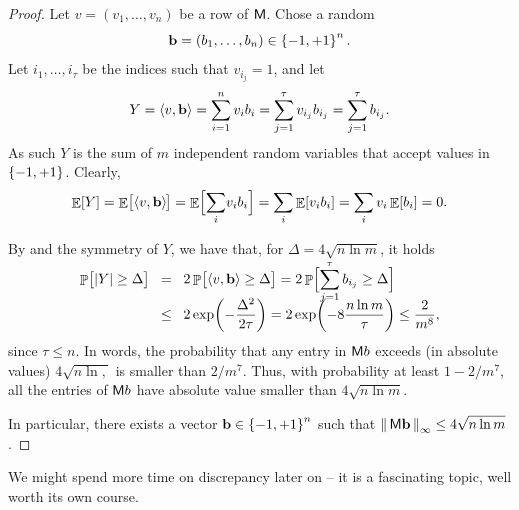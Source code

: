 \begin{proof}
    Let $v = (v_1, \ldots, v_n)$ be a row of $\mathsf{M}$. Chose a random
    \begin{equation*}
        \mathbf{b} = (b_1, \ldots, b_n) \in \left\{ {-1,+1} \right\}^n.
    \end{equation*}
    Let
    $i_1,\ldots, i_\tau$ be the indices such that $v_{i_j} =1$, and
    let
    \begin{equation*}
        Y%
        =%
        \DotProd{v}{\vecb} = \sum_{i=1}^n v_i b_i = \sum_{j=1}^\tau v_{i_j}
        b_{i_j}%
        =%
        \sum_{j=1}^\tau b_{i_j}.
    \end{equation*}
    As such $Y$ is the sum of $m$ independent random variables that
    accept values in $\left\{ {-1,+1} \right\}$.  Clearly,
    \begin{equation*}
        \Ex{Y}%
        =%
        \Ex{\bigl. \DotProd{v}{\vecb}\!\ts  }%
        =%
        \Ex{\Bigl.\smash{\sum_{i}} v_i b_i} =%
        \sum_{i} \Ex{v_i b_i} = \sum_{i} v_i \Ex{b_{i}} = 0.
    \end{equation*}

    By  and the
    symmetry of $Y$, we have that, for $\Delta = 4 \sqrt{n \ln{m}}$,
    it holds
    \begin{align*}
        \Prob{\bigl.\cardin{Y}\MakeSBig \geq \Delta} 
        &\EQ %
        2 \Prob{\bigl. \DotProd{v}{\vecb}  \geq \Delta }
        =%
        2 \Prob{\Bigl. \smash{\sum_{j=1}^\tau b_{i_j}} \geq \Delta}%
        \\
        &\LEQ%
        2 \exp \pth{ - \frac{\Delta^2}{2\tau}}
        =%
        2 \exp \pth{-8 {\frac{n\ln m}{\tau}}}%
        \leq%
        \frac{2}{m^{8}},
    \end{align*}
    since $\tau \leq n$.  In words, the probability that any entry in
    $\mathsf{M} b$ exceeds (in absolute values) $4 \sqrt{ n\ln ,}$ is
    smaller than $2/m^7$. Thus, with probability at least $1 - 2/m^7$,
    all the entries of $\mathsf{M} b$ have absolute value smaller than
    $4 \sqrt{n \ln m}$.
    
   In particular, there exists a vector $\mathbf{b} \in \left\{ {-1,+1} \right\}^n$ such
   that $\left\| {\,\mathsf{M} \mathbf{b} \, } \right\|_{\infty} \leq 4 \sqrt{n \ln m}$.
\end{proof}

We might spend more time on discrepancy later on -- it is a
fascinating topic, well worth its own course.



